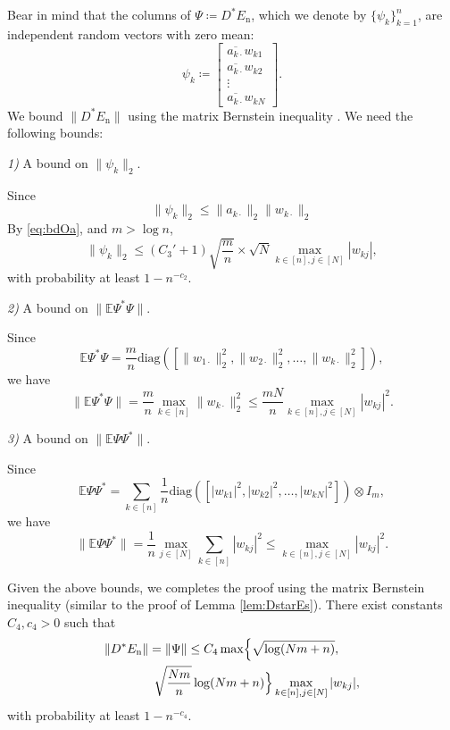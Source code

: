 \documentclass[11pt,journal]{IEEEtran}
\newcommand{\bbE}{\mathbb{E}}
\newcommand{\rmn}{\mathrm{n}}
\newcommand{\norm}[1]{\|{#1}\|}
\newcommand{\diag}{\mathrm{diag}}
\begin{document}

\begin{IEEEproof}
Bear in mind that the columns of $\Psi\coloneqq D^* E_\rmn$, which we denote by $\{\psi_k\}_{k=1}^n$, are independent random vectors with zero mean: 
\[
\psi_k \coloneqq \begin{bmatrix}
\overline{a_{k\cdot}} w_{k1}\\
\overline{a_{k\cdot}} w_{k2}\\
\vdots\\
\overline{a_{k\cdot}} w_{kN}
\end{bmatrix}.
\]
We bound $\norm{D^* E_\rmn}$ using the matrix Bernstein inequality \cite[Theorem 1.6]{Tropp2011}. We need the following bounds:

\emph{1)} A bound on $\norm{\psi_k}_2$.

Since
\[
\norm{\psi_k}_2 \leq \norm{a_{k\cdot}}_2 \norm{w_{k\cdot}}_2
\]
By \eqref{eq:bdOa}, and $m>\log n$,
\[
\norm{\psi_k}_2 \leq (C_3'+1) \sqrt{\frac{m}{n}} \times \sqrt{N}\max_{k\in[n], j\in[N]}|w_{kj}|,
\]
with probability at least $1-n^{-c_2}$.

\emph{2)} A bound on $\norm{\bbE \Psi^*\Psi}$.

Since
\[
\bbE \Psi^*\Psi = \frac{m}{n} \diag([\norm{w_{1\cdot}}_2^2,\norm{w_{2\cdot}}_2^2,\dots,\norm{w_{k\cdot}}_2^2]),
\]
we have
\[
\norm{\bbE \Psi^*\Psi} = \frac{m}{n} \max_{k\in[n]}\norm{w_{k\cdot}}_2^2 \leq \frac{mN}{n} \max_{k\in[n], j\in[N]}|w_{kj}|^2.
\]

\emph{3)} A bound on $\norm{\bbE \Psi\Psi^*}$.

Since
\[
\bbE \Psi\Psi^* = \sum_{k\in[n]} \frac{1}{n} \diag([|w_{k1}|^2,|w_{k2}|^2,\dots,|w_{kN}|^2])\otimes I_m,
\]
we have
\[
\norm{\bbE \Psi\Psi^*} = \frac{1}{n} \max_{j\in[N]} \sum_{k\in[n]}|w_{kj}|^2 \leq \max_{k\in[n], j\in[N]}|w_{kj}|^2.
\]

Given the above bounds, we completes the proof using the matrix Bernstein inequality (similar to the proof of Lemma \ref{lem:DstarEs}). There exist constants $C_4, c_4 >0$ such that
\begin{align*}
& \norm{D^* E_\rmn} = \norm{\Psi} \leq C_4 \max\Bigl\{\sqrt{\log (Nm+n)}, \\
& \qquad\qquad \sqrt{\frac{Nm}{n}} \log (Nm+n) \Bigr\} \max_{k\in[n], j\in[N]}|w_{kj}|,
\end{align*}
with probability at least $1-n^{-c_4}$.
\end{IEEEproof}
\end{document}
